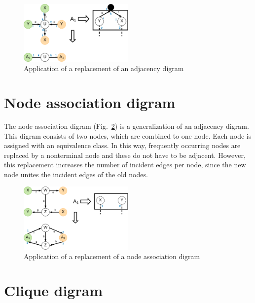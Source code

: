 \documentclass[a4paper]{scrartcl}
\begin{document}
\begin{figure}[h]
	\centering
	\includegraphics[width=0.5\textwidth]{img/adjacencyDigram}
	\caption{Application of a replacement of an adjacency digram}
	\label{fig:adjacencyDigram}
\end{figure}


\section{Node association digram}
\label{sec:associationDigram}


The node association digram (Fig.~\ref{fig:nodeAssociationDigram}) is a generalization of an adjacency digram.
This digram consists of two nodes, which are combined to one node. Each node is assigned with an equivalence class.
In this way, frequently occurring nodes are replaced by a nonterminal node and these do not have to be adjacent. However, this replacement increases the number of incident edges per node, since the new node unites the incident edges of the old nodes.

\begin{figure}[h]
	\centering
	\includegraphics[width=0.5\textwidth]{img/nodeAssociationDigram}
	\caption{Application of a replacement of a node association digram}
	\label{fig:nodeAssociationDigram}
\end{figure}


\section{Clique digram}
\label{sec:cliqueDigram}
\end{document}
